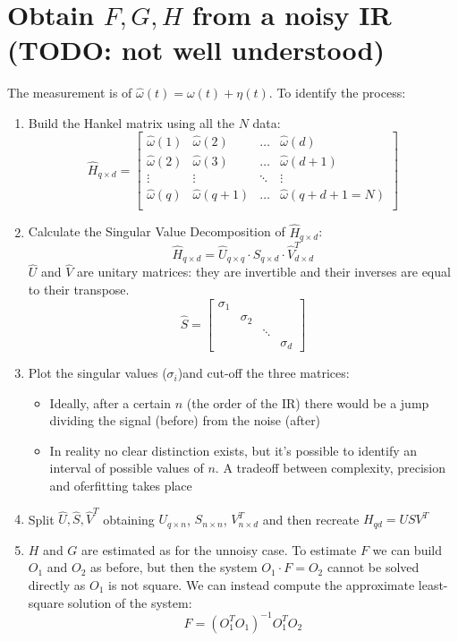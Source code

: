 \documentclass{article}
\begin{document}
\section{Obtain $F,G,H$ from a noisy IR (TODO: not well understood)}
The measurement is of $\hat{\omega}(t)=\omega(t)+\eta(t)$. To identify the process:
\begin{enumerate}
\item Build the Hankel matrix using all the $N$ data:
\[
\hat{H}_{q \times d}=
\begin{bmatrix}
\hat{\omega}(1)&\hat{\omega}(2)&\dots&\hat{\omega}(d)\\
\hat{\omega}(2)&\hat{\omega}(3)&\dots&\hat{\omega}(d+1)\\
\vdots&\vdots&\ddots&\vdots\\
\hat{\omega}(q)&\hat{\omega}(q+1)&\dots&\hat{\omega}(q+d+1=N)\\
\end{bmatrix}
\]
\item Calculate the Singular Value Decomposition of $\hat{H}_{q \times d}$:
\[
\hat{H}_{q \times d}=\hat{U}_{q \times q} \cdot \hat{S}_{q \times d} \cdot \hat{V}^T_{d \times d}
\]
$\hat{U}$ and $\hat{V}$ are unitary matrices: they are invertible and their inverses are equal to their transpose.
\[
\hat{S}=\begin{bmatrix}
\sigma_1\\
&\sigma_2\\
&&\ddots\\
&&&\sigma_d
\end{bmatrix}
\]
\item Plot the singular values ($\sigma_i$)and cut-off the three matrices:
	\begin{itemize}
	\item Ideally, after a certain $n$ (the order of the IR) there would be a jump dividing the signal (before) from the noise (after)
	\item In reality no clear distinction exists, but it's possible to identify an interval of possible values of $n$. A tradeoff between complexity, precision and oferfitting takes place
	\end{itemize}
\item Split $\hat{U},\hat{S},\hat{V}^T$ obtaining $U_{q \times n}$, $S_{n \times n}$, $V^T_{n \times d}$ and then recreate $H_{qd}=USV^T$
\item $H$ and $G$ are estimated as for the unnoisy case. To estimate $F$ we can build $O_1$ and $O_2$ as before, but then the system $O_1 \cdot F = O_2$ cannot be solved directly as $O_1$ is not square. We can instead compute the approximate least-square solution of the system:
\[
F=(O_1^TO_1)^{-1}O_1^TO_2
\]
\end{enumerate}
\end{document}

